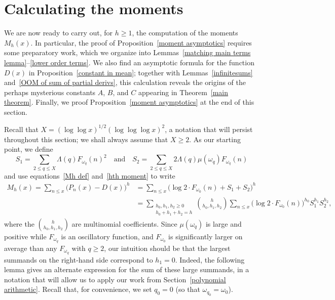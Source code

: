 \documentclass[12pt,reqno]{amsart}
\theoremstyle{definition}
\begin{document}
\section{Calculating the moments}\label{proof of moment asymptotics}

We are now ready to carry out, for $h \geq 1$, the computation of the moments $M_h(x)$. In particular, the proof of Proposition~\ref{moment asymptotics} requires some preparatory work, which we organize into Lemmas~\ref{matching main terms lemma}--\ref{lower order terms}.
We also find an asymptotic formula for the function $D(x)$ in Proposition~\ref{constant in mean}; together with Lemmas~\ref{infinitesums} and~\ref{OOM of sum of partial derivs}, this calculation reveals the origins of the perhaps mysterious constants $A$, $B$, and $C$ appearing in Theorem~\ref{main theorem}. Finally, we proof Proposition~\ref{moment asymptotics} at the end of this section.

Recall that $X = (\log\log x)^{1/2}(\log\log\log x)^2$, a notation that will persist throughout this section; we shall always assume that $X\ge2$.
As our starting point, we define
\begin{equation} \label{S1 S2 def}
S_1 = \sum_{2\le q \leq X} \Lambda(q) F_{\omega_{q}}(n)^2 \quad\text{and}\quad S_2 = \sum_{2\le q \leq X} 2 \Lambda(q) \mu(\omega_{q}) F_{\omega_{q}}(n)
\end{equation}
and use equations~\eqref{Mh def} and~\eqref{hth moment} to write
\begin{equation} \label{two way}
\begin{split}
M_h(x) = \sum_{n \leq x} \big( P_n(x) - D(x) \big)^h &= \sum_{n \leq x} \big( \log 2 \cdot F_{\omega_0}(n) + S_1 + S_2 \big)^h \\
&= \sum_{\substack{h_0,h_1,h_2\ge0 \\ h_0+h_1+h_2=h}} \binom h{h_0,h_1,h_2} \sum_{n \leq x} \big( \log 2 \cdot F_{\omega_0}(n) \big)^{h_0} S_1^{h_1}S_2^{h_2},
\end{split}
\end{equation}
where the $\binom h{h_0,h_1,h_2}$ are multinomial coefficients.
Since $\mu(\omega_q)$ is large and positive while $F_{\omega_q}$ is an oscillatory function, and $F_{\omega_0}$ is significantly larger on average than any $F_{\omega_q}$ with $q\ge2$, our intuition should be that the largest summands on the right-hand side correspond to $h_1=0$. Indeed, the following lemma gives an alternate expression for the sum of these large summands, in a notation that will allow us to apply our work from Section~\ref{polynomial arithmetic}.
Recall that, for convenience, we set $q_0 = 0$ (so that $\omega_{q_0} = \omega_0$).
\end{document}
